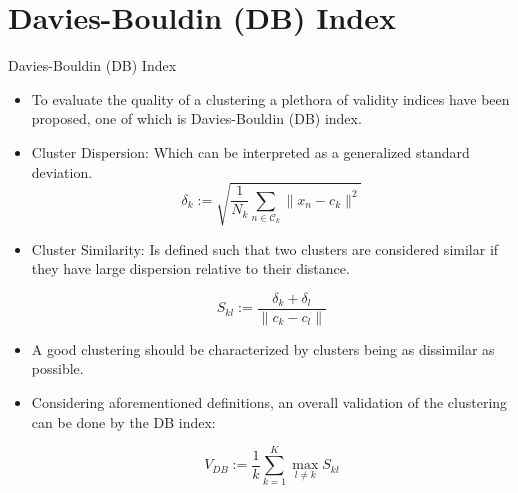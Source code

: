 \documentclass[compress,oilve]{beamer}
\newcommand{\tc}[2]{
	\textcolor{#1}{\hspace{-2pt}#2\hspace{-2pt}}
}
\begin{document}
\section{Davies-Bouldin (DB) Index}
\begin{frame}{Davies-Bouldin (DB) Index}
	\begin{itemize}
		\item To evaluate the quality of a clustering a plethora of validity indices have been proposed, one of which is Davies-Bouldin (DB) index.
		
		\item \tc{keywords}{Cluster Dispersion:}Which can be interpreted as a generalized standard deviation.
		\begin{equation*}
			\delta_{k} := \sqrt{\frac{1}{N_k}\sum_{n\in\mathcal{C}_k}\|x_n-c_k\|^2}
		\end{equation*}
		
		\medskip
		\item \tc{keywords}{Cluster Similarity:} Is defined such that two clusters are considered similar if they have large dispersion relative to their distance.
		
		\begin{equation*}
			S_{kl} := \frac{\delta_{k}+\delta_{l}}{\| c_k-c_l\|}
		\end{equation*}
	
		\medskip
		\item A good clustering should be characterized by clusters being as dissimilar as possible.
	
		\medskip
		\item Considering aforementioned definitions, an overall validation of the clustering can be done by the DB index:
		
		\begin{equation*}
			V_{DB} := \frac{1}{k}\sum_{k=1}^{K}\max_{l\neq k}S_{kl}
		\end{equation*}
	\end{itemize}

\end{frame}
\end{document}
